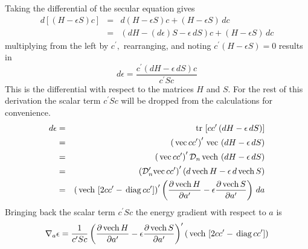 \documentclass[12pt,thmsa,suthesis,verbatim]{report}
\begin{document}
Taking the differential of the secular equation gives 
\begin{eqnarray}
d\left[ \left( H-\epsilon S\right) c\right] &=&d\left( H-\epsilon S\right)
c+\left( H-\epsilon S\right) \,dc  \nonumber \\
\ &=&\left( dH-\left( d\epsilon \right) S-\epsilon \,dS\right) c+\left(
H-\epsilon S\right) \,dc
\end{eqnarray}
multiplying from the left by $c^{\prime },$ rearranging, and noting $%
c^{\prime }\left( H-\epsilon S\right) =0$ results in 
\begin{equation}
d\epsilon =\frac{c^{\prime }\left( dH-\epsilon \,dS\right) c}{c^{\prime }Sc}
\end{equation}
This is the differential with respect to the matrices $H$ and $S$. For the
rest of this derivation the scalar term $c^{\prime }Sc$ will be dropped from
the calculations for convenience. 
\begin{eqnarray}
d\epsilon &=&\,\mathrm{tr}\,\left[ cc^{\prime }\left( dH-\epsilon
\,dS\right) \right]  \nonumber \\
\ &=&\left( \,\mathrm{vec}\,cc^{\prime }\right) ^{\prime }\,\mathrm{vec}%
\,\left( dH-\epsilon \,dS\right)  \nonumber \\
\ &=&\left( \,\mathrm{vec}\,cc^{\prime }\right) ^{\prime }\mathcal{D}_n\,%
\mathrm{vech}\,\left( dH-\epsilon \,dS\right)  \nonumber \\
\ &=&\left( \mathcal{D}_n^{\prime }\mathrm{vec}\,cc^{\prime }\right)
^{\prime }\left( d\,\mathrm{vech}\,H-\epsilon \,d\,\mathrm{vech}\,S\right) 
\nonumber \\
\ &=&\left( \,\mathrm{vech}\,\left[ 2cc^{\prime }-\,\mathrm{diag}%
\,cc^{\prime }\right] \right) ^{\prime }\left( \frac{\partial \,\mathrm{vech}%
\,H}{\partial a^{\prime }}-\epsilon \frac{\partial \,\mathrm{vech}\,S}{%
\partial a^{\prime }}\right) \,da
\end{eqnarray}
Bringing back the scalar term $c^{\prime }Sc$ the energy gradient with
respect to $a$ is 
\begin{equation}
\nabla _a\epsilon =\frac 1{c^{\prime }Sc}\left( \frac{\partial \,\mathrm{vech%
}\,H}{\partial a^{\prime }}-\epsilon \frac{\partial \,\mathrm{vech}\,S}{%
\partial a^{\prime }}\right) ^{\prime }\left( \,\mathrm{vech}\,\left[
2cc^{\prime }-\,\mathrm{diag}\,cc^{\prime }\right] \right)
\end{equation}
\end{document}
